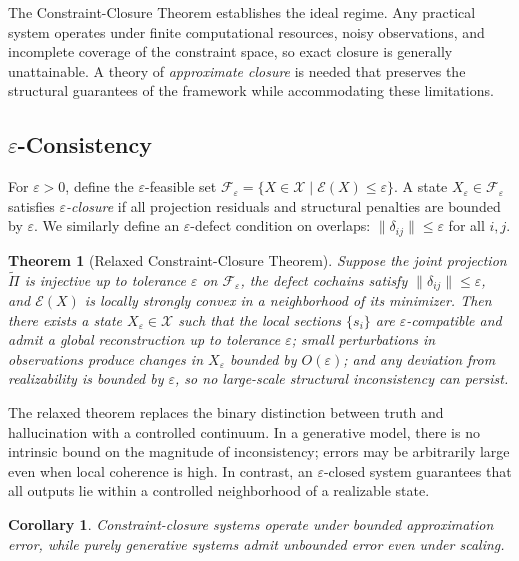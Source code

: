 \documentclass[11pt, oneside]{article}
\newtheorem{theorem}{Theorem}
\newtheorem{corollary}{Corollary}
\begin{document}
The Constraint-Closure Theorem establishes the ideal regime. Any practical system operates under finite computational resources, noisy observations, and incomplete coverage of the constraint space, so exact closure is generally unattainable. A theory of \emph{approximate closure} is needed that preserves the structural guarantees of the framework while accommodating these limitations.

\subsection{$\varepsilon$-Consistency}

For $\varepsilon > 0$, define the $\varepsilon$-feasible set $\mathcal{F}_\varepsilon = \{ X \in \mathcal{X} \mid \mathcal{E}(X) \leq \varepsilon \}$. A state $X_\varepsilon \in \mathcal{F}_\varepsilon$ satisfies \emph{$\varepsilon$-closure} if all projection residuals and structural penalties are bounded by $\varepsilon$. We similarly define an $\varepsilon$-defect condition on overlaps: $\|\delta_{ij}\| \leq \varepsilon$ for all $i,j$.

\begin{theorem}[Relaxed Constraint-Closure Theorem]
Suppose the joint projection $\tilde{\Pi}$ is injective up to tolerance $\varepsilon$ on $\mathcal{F}_\varepsilon$, the defect cochains satisfy $\|\delta_{ij}\| \leq \varepsilon$, and $\mathcal{E}(X)$ is locally strongly convex in a neighborhood of its minimizer. Then there exists a state $X_\varepsilon \in \mathcal{X}$ such that the local sections $\{s_i\}$ are $\varepsilon$-compatible and admit a global reconstruction up to tolerance $\varepsilon$; small perturbations in observations produce changes in $X_\varepsilon$ bounded by $O(\varepsilon)$; and any deviation from realizability is bounded by $\varepsilon$, so no large-scale structural inconsistency can persist.
\end{theorem}

The relaxed theorem replaces the binary distinction between truth and hallucination with a controlled continuum. In a generative model, there is no intrinsic bound on the magnitude of inconsistency; errors may be arbitrarily large even when local coherence is high. In contrast, an $\varepsilon$-closed system guarantees that all outputs lie within a controlled neighborhood of a realizable state.

\begin{corollary}
Constraint-closure systems operate under bounded approximation error, while purely generative systems admit unbounded error even under scaling.
\end{corollary}
\end{document}
